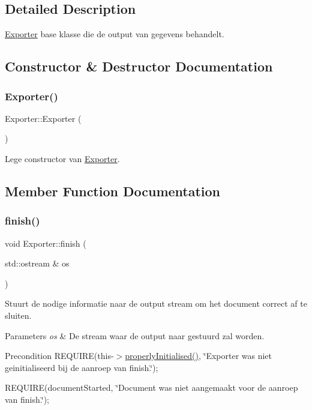 \subsection{Detailed Description}
\hyperlink{class_exporter}{Exporter} base klasse die de output van gegevens behandelt. 

\subsection{Constructor \& Destructor Documentation}
\mbox{\label{class_exporter_a2a977cb5ac8f637fcb570e73f650eca0}} 
\subsubsection{\texorpdfstring{Exporter()}{Exporter()}}
{\footnotesize\ttfamily Exporter\+::\+Exporter (\begin{DoxyParamCaption}{ }\end{DoxyParamCaption})}



Lege constructor van \hyperlink{class_exporter}{Exporter}. 



\subsection{Member Function Documentation}
\mbox{\label{class_exporter_ae477714f462d70cfc5b3970f91fcc4ed}} 
\subsubsection{\texorpdfstring{finish()}{finish()}}
{\footnotesize\ttfamily void Exporter\+::finish (\begin{DoxyParamCaption}\item[{std\+::ostream \&}]{os }\end{DoxyParamCaption})\hspace{0.3cm}{\ttfamily [virtual]}}



Stuurt de nodige informatie naar de output stream om het document correct af te sluiten. 


\begin{DoxyParams}{Parameters}
{\em os} & De stream waar de output naar gestuurd zal worden. \\
\hline
\end{DoxyParams}
\begin{DoxyPrecond}{Precondition}
R\+E\+Q\+U\+I\+RE(this-\/$>$\hyperlink{class_exporter_aafd9df9210aeefd7bb7fd434fc317cf0}{properly\+Initialised()}, \char`\"{}\+Exporter was niet geinitialiseerd bij de aanroep van finish.\char`\"{}); 

R\+E\+Q\+U\+I\+RE(document\+Started, \char`\"{}\+Document was niet aangemaakt voor de aanroep van finish.\char`\"{}); 
\end{DoxyPrecond}


